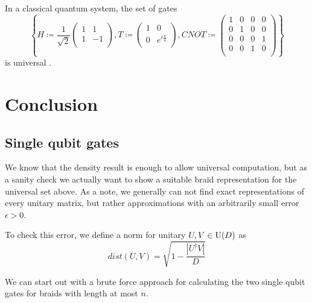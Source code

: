 \documentclass{article}
\begin{document}
\begin{thm}\label{ClassicalGateSet}
  In a classical quantum system, the set of gates 
  \[
     \left\{H \coloneqq \frac{1}{\sqrt{2} }\begin{pmatrix}
      1 &  1 \\
      1 &  -1 \\
    \end{pmatrix}, T \coloneqq  \begin{pmatrix}
      1 &  0 \\
      0 &  e^{i \frac{\pi}{4}} \\
    \end{pmatrix}, CNOT \coloneqq  \begin{pmatrix}
      1 & 0 & 0 &  0 \\
      0 & 1 & 0 &  0 \\
      0 & 0 & 0 &  1 \\
      0 & 0 & 1 &  0 \\
    \end{pmatrix}\right\}
  \]
  is universal \cite{brylinski_universal_2001}.
\end{thm}

\section{Conclusion}
\label{Conclusion}
\subsection{Single qubit gates}
We know that the density result is enough to allow universal computation, but as a sanity check we actually want to show a suitable braid representation for the universal set above. As a note, we generally can not find exact representations of every unitary matrix, but rather approximations with an arbitrarily small error $\epsilon > 0$.

To check this error, we define a norm for unitary $U,V \in \mathrm{U}(D)$ as
\begin{equation}
  dist(U,V) = \sqrt{1 - \frac{\left\vert U^{\dagger} V \right\vert }{D}} \label{eq:norm}
\end{equation}

We can start out with a brute force approach for calculating the two single qubit gates for braids with length at most $n$. 
\end{document}
